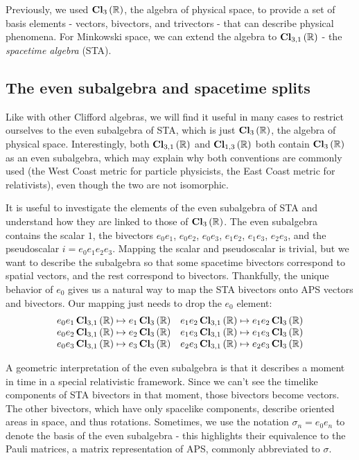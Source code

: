 Previously, we used $\operatorname{\mathbf{Cl}}_{3}\left(\mathbb{R}\right)$, the algebra of physical space, to provide a set of basis elements - 
vectors, bivectors, and trivectors - that can describe physical phenomena. For Minkowski space, we
can extend the algebra to $\operatorname{\mathbf{Cl}}_{3,1}\left(\mathbb{R}\right)$ - the \textit{spacetime algebra} (STA).

\subsection{The even subalgebra and spacetime splits}

Like with other Clifford algebras, we will find it useful in many cases to restrict ourselves to the
even subalgebra of STA, which is just $\operatorname{\mathbf{Cl}}_{3}\left(\mathbb{R}\right)$, the algebra of physical space. Interestingly, both
$\operatorname{\mathbf{Cl}}_{3,1}\left(\mathbb{R}\right)$ and $\operatorname{\mathbf{Cl}}_{1,3}\left(\mathbb{R}\right)$ both contain $\operatorname{\mathbf{Cl}}_{3}\left(\mathbb{R}\right)$ as an even subalgebra, which may explain why both
conventions are commonly used (the West Coast metric for particle physicists, the East Coast metric
for relativists), even though the two are not isomorphic.

It is useful to investigate the elements of the even subalgebra of STA and understand how they are
linked to those of $\operatorname{\mathbf{Cl}}_{3}\left(\mathbb{R}\right)$. The even subalgebra contains the scalar $1$, the bivectors $e_0 e_1$,
$e_0 e_2$, $e_0 e_3$, $e_1 e_2$, $e_1 e_3$, $e_2 e_3$, and the pseudoscalar $i = e_0 e_1 e_2 e_3$.
Mapping the scalar and pseudoscalar is trivial, but we want to describe the subalgebra so that some
spacetime bivectors correspond to spatial vectors, and the rest correspond to bivectors. Thankfully,
the unique behavior of $e_0$ gives us a natural way to map the STA bivectors onto APS vectors and
bivectors. Our mapping just needs to drop the $e_0$ element:
$$
\begin{matrix}
    e_0 e_1 \operatorname{\mathbf{Cl}}_{3,1}\left(\mathbb{R}\right) \mapsto e_1 \operatorname{\mathbf{Cl}}_{3}\left(\mathbb{R}\right) & e_1 e_2 \operatorname{\mathbf{Cl}}_{3,1}\left(\mathbb{R}\right) \mapsto e_1 e_2 \operatorname{\mathbf{Cl}}_{3}\left(\mathbb{R}\right) \\
    e_0 e_2 \operatorname{\mathbf{Cl}}_{3,1}\left(\mathbb{R}\right) \mapsto e_2 \operatorname{\mathbf{Cl}}_{3}\left(\mathbb{R}\right) & e_1 e_3 \operatorname{\mathbf{Cl}}_{3,1}\left(\mathbb{R}\right) \mapsto e_1 e_3 \operatorname{\mathbf{Cl}}_{3}\left(\mathbb{R}\right) \\
    e_0 e_3 \operatorname{\mathbf{Cl}}_{3,1}\left(\mathbb{R}\right) \mapsto e_3 \operatorname{\mathbf{Cl}}_{3}\left(\mathbb{R}\right) & e_2 e_3 \operatorname{\mathbf{Cl}}_{3,1}\left(\mathbb{R}\right) \mapsto e_2 e_3 \operatorname{\mathbf{Cl}}_{3}\left(\mathbb{R}\right) \\
\end{matrix}
$$

A geometric interpretation of the even subalgebra is that it describes a moment in time in a special
relativistic framework. Since we can't see the timelike components of STA bivectors in that moment,
those bivectors become vectors. The other bivectors, which have only spacelike components, describe
oriented areas in space, and thus rotations. Sometimes, we use the notation $\sigma_n = e_0 e_n$ to
denote the basis of the even subalgebra - this highlights their equivalence to the Pauli matrices, a
matrix representation of APS, commonly abbreviated to $\sigma$.

